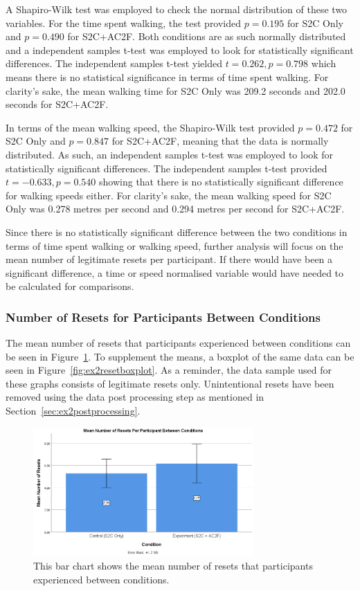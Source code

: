 A Shapiro-Wilk test was employed to check the normal distribution of these two variables. For the time spent walking, the test provided $p = 0.195$ for S2C Only and $p = 0.490$ for S2C+AC2F. Both conditions are as such normally distributed and a independent samples t-test was employed to look for statistically significant differences. The independent samples t-test yielded $t = 0.262, p = 0.798$ which means there is no statistical significance in terms of time spent walking. For clarity's sake, the mean walking time for S2C Only was 209.2 seconds and 202.0 seconds for S2C+AC2F. 

In terms of the mean walking speed, the Shapiro-Wilk test provided $p = 0.472$ for S2C Only and $p = 0.847$ for S2C+AC2F, meaning that the data is normally distributed. As such, an independent samples t-test was employed to look for statistically significant differences. The independent samples t-test provided $t = -0.633, p = 0.540$ showing that there is no statistically significant difference for walking speeds either. For clarity's sake, the mean walking speed for S2C Only was 0.278 metres per second and 0.294 metres per second for S2C+AC2F.

Since there is no statistically significant difference between the two conditions in terms of time spent walking or walking speed, further analysis will focus on the mean number of legitimate resets per participant. If there would have been a significant difference, a time or speed normalised variable would have needed to be calculated for comparisons. 

\subsubsection{Number of Resets for Participants Between Conditions}
The mean number of resets that participants experienced between conditions can be seen in Figure~\ref{fig:ex2resetMeans}. To supplement the means, a boxplot of the same data can be seen in Figure~\ref{fig:ex2resetboxplot}. As a reminder, the data sample used for these graphs consists of legitimate resets only. Unintentional resets have been removed using the data post processing step as mentioned in Section~\ref{sec:ex2postprocessing}.

\begin{figure}[tbph]
    \centering
    \includegraphics[width=0.75\textwidth]{figures/graphs/ResetMeans.png}
    \caption[Mean Number of Resets Between Conditions for Experiment 2]{This bar chart shows the mean number of resets that participants experienced between conditions.}
    \label{fig:ex2resetMeans}
\end{figure}

